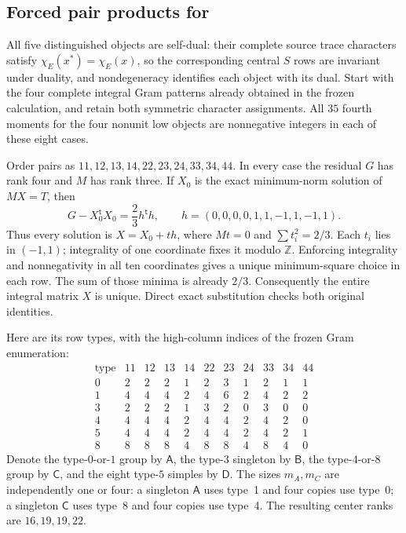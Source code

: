 \subsection{Forced pair products for }

All five distinguished objects are self-dual: their complete source
trace characters satisfy $\chi_E(x^*)=\chi_E(x)$, so the corresponding
central $S$ rows are invariant under duality, and nondegeneracy identifies
each object with its dual.  Start with the four complete integral Gram
patterns already obtained in the frozen calculation, and retain both
symmetric character assignments.  All $35$ fourth moments for the four
nonunit low objects are nonnegative integers in each of these eight cases.

Order pairs as $11,12,13,14,22,23,24,33,34,44$.  In every case
the residual $G$ has rank four and $M$ has rank three.  If $X_0$ is the
exact minimum-norm solution of $MX=T$, then
\[
 G-X_0^{\mathsf t}X_0=\frac23h^{\mathsf t}h,
 \qquad h=(0,0,0,0,1,1,-1,1,-1,1).
\]
Thus every solution is $X=X_0+t h$, where $Mt=0$ and
$\sum t_i^2=2/3$.  Each $t_i$ lies in $(-1,1)$; integrality of one
coordinate fixes it modulo $\mathbb Z$.  Enforcing integrality and
nonnegativity in all ten coordinates gives a unique minimum-square
choice in each row.  The sum of those minima is already $2/3$.
Consequently the entire integral matrix $X$ is unique.  Direct exact
substitution checks both original identities.

Here are its row types, with the high-column indices of the frozen
Gram enumeration:
\[
\begin{array}{c|rrrrrrrrrr}
\text{type}&11&12&13&14&22&23&24&33&34&44\\\hline
0&2&2&2&1&2&3&1&2&1&1\\
1&4&4&4&2&4&6&2&4&2&2\\
3&2&2&2&1&3&2&0&3&0&0\\
4&4&4&4&2&4&4&2&4&2&0\\
5&4&4&4&2&4&4&2&4&2&1\\
8&8&8&8&4&8&8&4&8&4&0
\end{array}
\]
Denote the type-$0$-or-$1$ group by $\mathsf A$, the type-$3$
singleton by $\mathsf B$, the type-$4$-or-$8$ group by $\mathsf C$,
and the eight type-$5$ simples by $\mathsf D$.  The sizes
$m_A,m_C$ are independently one or four: a singleton $\mathsf A$
uses type~1 and four copies use type~0; a singleton $\mathsf C$ uses
type~8 and four copies use type~4.  The resulting center ranks are
$16,19,19,22$.

